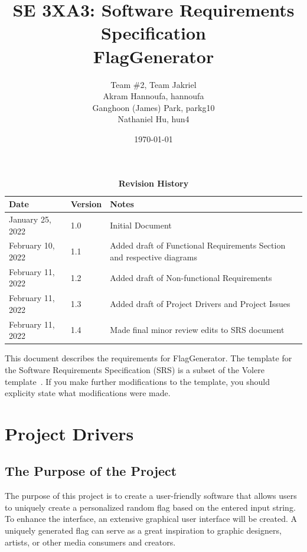 \documentclass[12pt, titlepage]{article}
\title{SE 3XA3: Software Requirements Specification\\FlagGenerator}
\author{Team \#2, Team Jakriel
        \\ Akram Hannoufa, hannoufa
        \\ Ganghoon (James) Park, parkg10
        \\ Nathaniel Hu, hun4
}
\date{\today}
\begin{document}
\maketitle

\tableofcontents
\listoftables
\listoffigures

\begin{table}[bp]
\caption{\bf Revision History}
\begin{tabularx}{\textwidth}{p{3cm}p{2cm}X}
\toprule {\bf Date} & {\bf Version} & {\bf Notes}\\
\midrule
January 25, 2022 & 1.0 & Initial Document\\
February 10, 2022 & 1.1 & Added draft of Functional Requirements Section and respective diagrams\\
February 11, 2022 & 1.2 & Added draft of Non-functional Requirements\\
February 11, 2022 & 1.3 & Added draft of Project Drivers and Project Issues\\
February 11, 2022 & 1.4 & Made final minor review edits to SRS document\\
\bottomrule
\end{tabularx}
\end{table}

\newpage


\noindent This document describes the requirements for FlagGenerator. The template for
the Software Requirements Specification (SRS) is a subset of the Volere
template~\citep{RobertsonAndRobertson2012}.  If you make further modifications
to the template, you should explicity state what modifications were made.

\section{Project Drivers}

\subsection{The Purpose of the Project}

The purpose of this project is to create a user-friendly software that allows users to uniquely create a personalized random flag based on the entered input string. To enhance the interface, an extensive graphical user interface will be created. A uniquely generated flag can serve as a great inspiration to graphic designers, artists, or other media consumers and creators.
\end{document}
